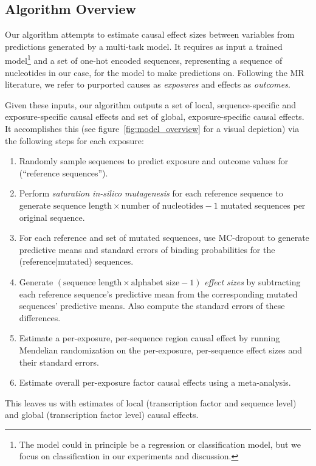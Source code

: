 \documentclass{article}
\begin{document}
\subsection{Algorithm Overview}
\label{sec:algo_overview}
Our algorithm attempts to estimate causal effect sizes between variables from predictions generated by a multi-task model. It requires as input a trained model\footnote{The model could in principle be a regression or classification model, but we focus on classification in our experiments and discussion.} and a set of one-hot encoded sequences, representing a sequence of nucleotides in our case, for the model to make predictions on. Following the MR literature, we refer to purported causes as \textit{exposures} and effects as \textit{outcomes}.

Given these inputs, our algorithm outputs a set of local, sequence-specific and exposure-specific causal effects and set of global, exposure-specific causal effects. It accomplishes this (see figure~\ref{fig:model_overview} for a visual depiction) via the following steps for each exposure:
\begin{enumerate}
    \item Randomly sample sequences to predict exposure and outcome values for (``reference sequences'').
    \item Perform \textit{saturation in-silico mutagenesis} for each reference sequence to generate \( \text{sequence\ length} \times \text{number\ of\ nucleotides} - 1 \) mutated sequences per original sequence.
    \item For each reference and set of mutated sequences, use MC-dropout  to generate predictive means and standard errors of binding probabilities for the (reference|mutated) sequences.
    \item Generate \( (\text{sequence length} \times \text{alphabet size} - 1) \) \textit{effect sizes} by subtracting each reference sequence's predictive mean from the corresponding mutated sequences' predictive means. Also compute the standard errors of these differences.
    \item Estimate a per-exposure, per-sequence region causal effect by running Mendelian randomization on the per-exposure, per-sequence effect sizes and their standard errors.
    \item Estimate overall per-exposure factor causal effects using a meta-analysis.
\end{enumerate}

This leaves us with estimates of local (transcription factor and sequence level) and global (transcription factor level) causal effects. 
\end{document}
